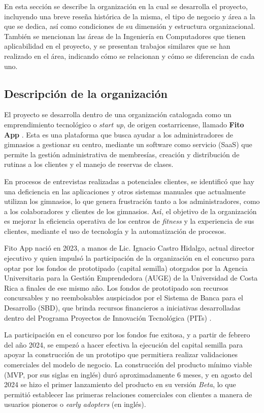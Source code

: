 En esta sección se describe la organización en la cual se desarrolla el proyecto, incluyendo una breve reseña histórica de la misma, el tipo de negocio y área a la que se dedica, así como condiciones de su dimensión y estructura organizacional. También se mencionan las áreas de la Ingeniería en Computadores que tienen aplicabilidad en el proyecto, y se presentan trabajos similares que se han realizado en el área, indicando cómo se relacionan y cómo se diferencian de cada uno.

\subsection{Descripción de la organización}

El proyecto se desarrolla dentro de una organización catalogada como un emprendimiento tecnológico o \textit{start up}, de origen costarricense, llamado \textbf{Fito App} \cite{fito_app}. Esta es una plataforma que busca ayudar a los administradores de gimnasios a gestionar su centro, mediante un software como servicio (SaaS) que permite la gestión administrativa de membresías, creación y distribución de rutinas a los clientes y el manejo de reservas de clases. 

En procesos de entrevistas realizadas a potenciales clientes, se identificó que hay una deficiencia en las aplicaciones y otros sistemas manuales que actualmente utilizan los gimnasios, lo que genera frustración tanto a los administradores, como a los colaboradores y clientes de los gimnasios. Así, el objetivo de la organización es mejorar la eficiencia operativa de los centros de \textit{fitness} y la experiencia de sus clientes, mediante el uso de tecnología y la automatización de procesos.


Fito App nació en 2023, a manos de Lic. Ignacio Castro Hidalgo, actual director ejecutivo y quien impulsó la participación de la organización en el concurso para optar por los fondos de prototipado (capital semilla) otorgados por la Agencia Universitaria para la Gestión Emprendedora (AUGE) de la Universidad de Costa Rica a finales de ese mismo año. Los fondos de prototipado son recursos concursables y no reembolsables auspiciados por el Sistema de Banca para el Desarrollo (SBD), que brinda recursos financieros a iniciativas desarrolladas dentro del Programa Proyectos de Innovación Tecnológica (PITs) \cite{auge_fondos}.

La participación en el concurso por los fondos fue exitosa, y a partir de febrero del año 2024, se empezó a hacer efectiva la ejecución del capital semilla para apoyar la construcción de un prototipo que permitiera realizar validaciones comerciales del modelo de negocio. La construcción del producto mínimo viable (MVP, por sus siglas en inglés) duró aproximadamente 6 meses, y en agosto del 2024 se hizo el primer lanzamiento del producto en su versión \textit{Beta}, lo que permitió establecer las primeras relaciones comerciales con clientes a manera de usuarios pioneros o \textit{early adopters} (en inglés).

